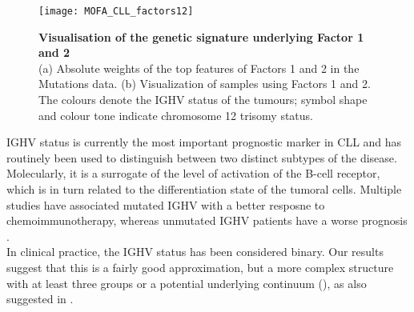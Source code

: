 \begin{figure}[H]
	\centering 	
	\texttt{[image: MOFA\_CLL\_factors12]}
	\caption{\textbf{Visualisation of the genetic signature underlying Factor 1 and 2}\\
	(a) Absolute weights of the top features of Factors 1 and 2 in the Mutations data.
	(b) Visualization of samples using Factors 1 and 2. The colours denote the IGHV status of the tumours; symbol shape and colour tone indicate chromosome 12 trisomy status.
	}
	\label{fig:MOFA_CLL_factors12}
\end{figure}

IGHV status is currently the most important prognostic marker in CLL and has routinely been used to distinguish between two distinct subtypes of the disease\cite{Fabbri2016}. Molecularly, it is a surrogate of the level of activation of the B-cell receptor, which is in turn related to the differentiation state of the tumoral cells. Multiple studies have associated mutated IGHV with a better resposne to chemoimmunotherapy, whereas unmutated IGHV patients have a worse prognosis \cite{Fabbri2016,Bulian2017,Crombie2017}.\\
In clinical practice, the IGHV status has been considered binary. Our results suggest that this is a fairly good approximation, but a more complex structure with at least three groups or a potential underlying continuum (), as also suggested in \cite{Queiros2015}.




